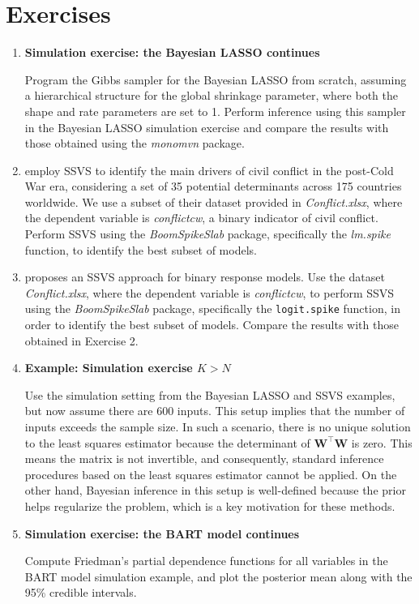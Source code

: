 \section{Exercises}\label{13_7}

\begin{enumerate}
	\item \textbf{Simulation exercise: the Bayesian LASSO continues}
	
	Program the Gibbs sampler for the Bayesian LASSO from scratch, assuming a hierarchical structure for the global shrinkage parameter, where both the shape and rate parameters are set to 1. Perform inference using this sampler in the Bayesian LASSO simulation exercise and compare the results with those obtained using the \textit{monomvn} package.
	
	\item \cite{jetter2022postcold} employ SSVS to identify the main drivers of civil conflict in the post-Cold War era, considering a set of 35 potential determinants across 175 countries worldwide. We use a subset of their dataset provided in \textit{Conflict.xlsx}, where the dependent variable is \textit{conflictcw}, a binary indicator of civil conflict. Perform SSVS using the \textit{BoomSpikeSlab} package, specifically the \textit{lm.spike} function, to identify the best subset of models.
	
	\item \cite{tuchler2008bayesian} proposes an SSVS approach for binary response models. Use the dataset \textit{Conflict.xlsx}, where the dependent variable is \textit{conflictcw}, to perform SSVS using the \textit{BoomSpikeSlab} package, specifically the \texttt{logit.spike} function, in order to identify the best subset of models. Compare the results with those obtained in Exercise 2.
	
	\item \textbf{Example: Simulation exercise $K > N$}
	
	Use the simulation setting from the Bayesian LASSO and SSVS examples, but now assume there are 600 inputs. This setup implies that the number of inputs exceeds the sample size. In such a scenario, there is no unique solution to the least squares estimator because the determinant of $\mathbf{W}^{\top} \mathbf{W}$ is zero. This means the matrix is not invertible, and consequently, standard inference procedures based on the least squares estimator cannot be applied. On the other hand, Bayesian inference in this setup is well-defined because the prior helps regularize the problem, which is a key motivation for these methods.
	
	\item \textbf{Simulation exercise: the BART model continues} 
	
	Compute Friedman’s partial dependence functions \cite{friedman2001greedy} for all variables in the BART model simulation example, and plot the posterior mean along with the 95\% credible intervals.
	
	  
\end{enumerate}


